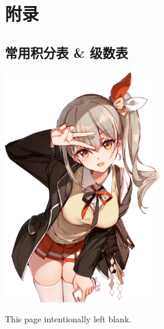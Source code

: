 \chapter*{附录}

\section*{常用积分表 \& 级数表}

\vspace{4em}
\begin{center}
\includegraphics[height=10cm]{images/aki-rinco.png}
\end{center}
\vspace{4em}
\begin{center}
\Huge This page intentionally left blank.
\end{center}






